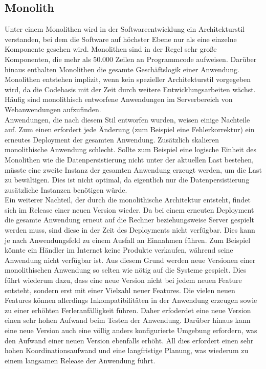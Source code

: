 \subsection{Monolith}
Unter einem Monolithen wird in der Softwareentwicklung ein Architekturstil verstanden, bei dem die Software auf höchster Ebene nur als eine einzelne Komponente gesehen wird. Monolithen sind in der Regel sehr große Komponenten, die mehr als 50.000 Zeilen an Programmcode aufweisen. Darüber hinaus enthalten Monolithen die gesamte Geschäftslogik einer Anwendung. Monolithen entstehen implizit, wenn kein spezieller Architekturstil vorgegeben wird, da die Codebasis mit der Zeit durch weitere Entwicklungsarbeiten wächst. Häufig sind monolithisch entworfene Anwendungen im Serverbereich von Webanwendungen aufzufinden. \\
Anwendungen, die nach diesem Stil entworfen wurden, weisen einige Nachteile auf. Zum einen erfordert jede Änderung (zum Beispiel eine Fehlerkorrektur) ein erneutes Deployment der gesamten Anwendung. Zusätzlich skalieren monolithische Anwendung schlecht. Sollte zum Beispiel eine logische Einheit des Monolithen wie die Datenpersistierung nicht unter der aktuellen Last bestehen, müsste eine zweite Instanz der gesamten Anwendung erzeugt werden, um die Last zu bewältigen. Dies ist nicht optimal, da eigentlich nur die Datenpersistierung zusätzliche Instanzen benötigen würde. \\
Ein weiterer Nachteil, der durch die monolithische Architektur entsteht, findet sich im Release einer neuen Version wieder. Da bei einem erneuten Deployment die gesamte Anwendung erneut auf die Rechner beziehungsweise Server gespielt werden muss, sind diese in der Zeit des Deployments nicht verfügbar. Dies kann je nach Anwendungsfeld zu einem Ausfall an Einnahmen führen. Zum Beispiel könnte ein Händler im Internet keine Produkte verkaufen, während seine Anwendung nicht verfügbar ist. Aus diesem Grund werden neue Versionen einer monolithischen Anwendung so selten wie nötig auf die Systeme gespielt. Dies führt wiederum dazu, dass eine neue Version nicht bei jedem neuen Feature entsteht, sondern erst mit einer Vielzahl neuer Features. Die vielen neuen Features können allerdings Inkompatibilitäten in der Anwendung erzeugen sowie zu einer erhöhten Ferleranfälligkeit führen. Daher erfoderdet eine neue Version einen sehr hohen Aufwand beim Testen der Anwendung. Darüber hinaus kann eine neue Version auch eine völlig anders konfigurierte Umgebung erfordern, was den Aufwand einer neuen Version ebenfalls erhöht. All dies erfordert einen sehr hohen Koordinationsaufwand und eine langfristige Planung, was wiederum zu einem langsamen Release der Anwendung führt.
